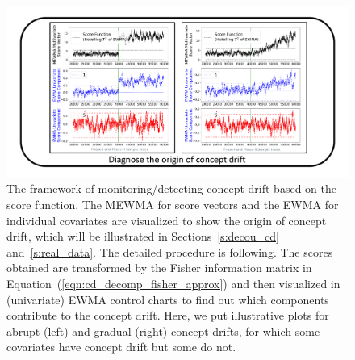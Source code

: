 \documentclass[twoside,11pt]{article}
\begin{document}
\begin{figure}
\centering
\includegraphics[width = 1\linewidth, trim=.35in .20in .35in .20in, clip]{../figures/v14/flow_chart/Diagnose_1.png}
\caption{The framework of monitoring/detecting concept drift based on the score function. The MEWMA for score vectors and the EWMA for individual covariates are visualized to show the origin of concept drift, which will be illustrated in Sections~\ref{s:decou_cd} and~\ref{s:real_data}. The detailed procedure is following. The scores obtained are transformed by the Fisher information matrix in Equation~(\ref{eqn:cd_decomp_fisher_approx}) and then visualized in (univariate) EWMA control charts to find out which components contribute to the concept drift. Here, we put illustrative plots for abrupt (left) and gradual (right) concept drifts, for which some covariates have concept drift but some do not.}
\label{fig:proc_mon_score_diagnosis}
\end{figure}
\end{document}
